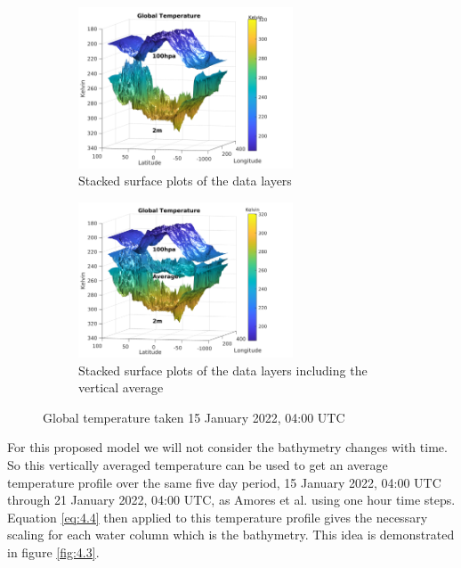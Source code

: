 \documentclass[twoside]{bsu-ms}
\begin{document}
 \begin{figure}[!htbp]
 \vspace{-15pt}
\centering
\begin{subfigure}{\textwidth}
  \centering
  \includegraphics[width=0.7\textwidth,clip=True,trim=0.2cm 0cm 1.7cm 0.3cm]{images/2layer.png}
  \caption{Stacked surface plots of the data layers}
\end{subfigure}%

\medskip

\begin{subfigure}{\textwidth}
  \centering
  \includegraphics[width=0.7\textwidth,clip=True,trim=0.2cm 0cm 1.7cm 0.3cm]{images/3layer.png}
  \caption{Stacked surface plots of the data layers including the vertical average}
\end{subfigure}
\caption{Global temperature taken 15 January 2022, 04:00 $\mathrm{UTC}$}
\label{fig:4.2}
\end{figure}
For this proposed model we will not consider the bathymetry changes with time. So this vertically averaged temperature can be used to get an average temperature profile over the same five day period, 15 January 2022, 04:00 $\mathrm{UTC}$ through 21 January 2022, 04:00 $\mathrm{UTC}$, as Amores et al. \cite{amores2022numerical} using one hour time steps. Equation \eqref{eq:4.4} then applied to this temperature profile gives the necessary scaling for each water column which is the bathymetry. This idea is demonstrated in figure \ref{fig:4.3}.
\end{document}
